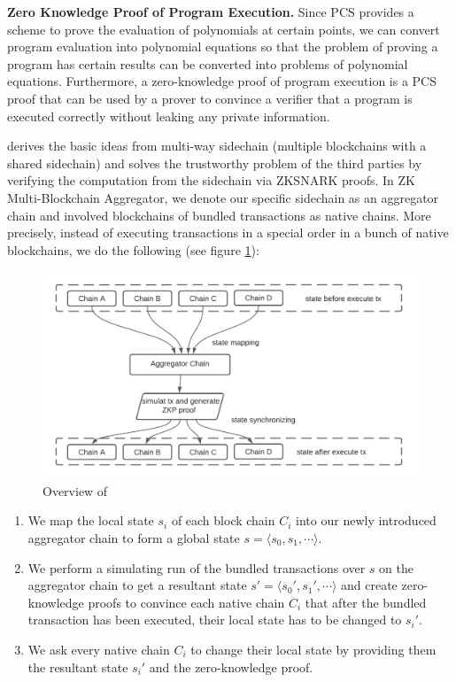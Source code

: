 \documentclass[pageno]{jpaper}
\begin{document}
\smallskip\noindent\textbf{Zero Knowledge Proof of Program Execution.}
Since PCS provides a scheme to prove the evaluation of polynomials at certain points, we can convert program evaluation into polynomial equations so that the problem of proving a program has certain results can be converted into problems of polynomial equations. Furthermore, a zero-knowledge proof \cite{cramer1998zero-zkp,kate2010constant-zkp,damgaard1998commitment-zkp} of program execution is a PCS proof that can be used by a prover to convince a verifier that a program is executed correctly without leaking any private information.

\dprotocol derives the basic ideas from multi-way sidechain (multiple blockchains with a shared sidechain) and solves the trustworthy problem of the third parties by verifying the computation from the sidechain via ZKSNARK proofs. In ZK Multi-Blockchain Aggregator, we denote our specific sidechain as an aggregator chain and involved blockchains of bundled transactions as native chains. More precisely, instead of executing transactions in a special order in a bunch of native blockchains, we do the following (see figure \ref{main-idea}):

\begin{figure}[!ht]
\centerline{\includegraphics[scale=0.4]{main-idea}}
\caption{Overview of \dprotocol}\label{main-idea}
\end{figure}
\begin{enumerate}[leftmargin=*]
\item We map the local state $s_i$ of each block chain $C_i$ into our newly introduced aggregator chain to form a global state $s = \langle s_0, s_1, \cdots \rangle$.
\item We perform a simulating run of the bundled transactions over $s$ on the aggregator chain to get a resultant state $s' = \langle s_0', s_1', \cdots \rangle$ and create zero-knowledge proofs to convince each native chain $C_i$ that after the bundled transaction has been executed, their local state has to be changed to $s_i'$.
\item We ask every native chain $C_i$ to change their local state by providing them the resultant state $s_i'$ and the zero-knowledge proof.
\end{enumerate}
\end{document}
